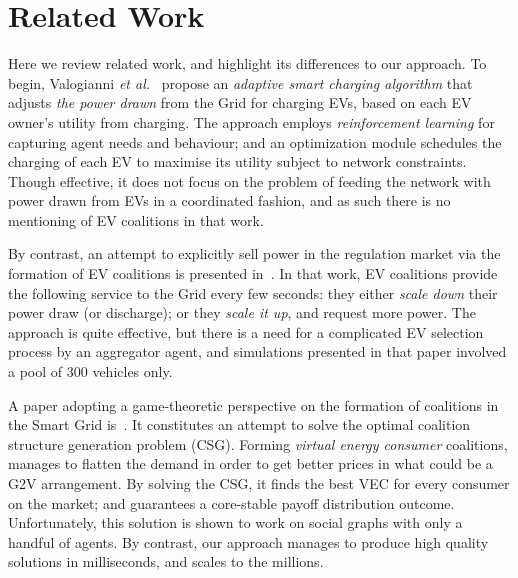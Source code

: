 
\chapter{Related Work} %

\label{Chapter2} %






Here we review related work, and highlight its differences to our approach.
To begin, Valogianni {\em et al.}~\cite{valogianni2014effective} propose an {\em adaptive smart charging algorithm} that adjusts {\em the power drawn} from the Grid for charging EVs, based on each EV owner's utility from charging. The approach employs {\em reinforcement learning} for capturing agent needs and behaviour; and an optimization module schedules the charging of each EV to maximise its utility subject to network constraints. Though effective, it does not focus on the problem of feeding the network with power drawn from EVs in a coordinated fashion, and as such there is no mentioning of EV coalitions in that work.

By contrast, an attempt to explicitly sell power in the regulation market via the formation of EV coalitions is presented in~\cite{kamboj2010exploring}. In that work, EV coalitions provide the following service to the Grid every few seconds: they either {\em scale down} their power draw (or discharge); or they {\em scale it up}, and request more power.
The approach is quite effective, but there is a need for a complicated EV selection process by an aggregator agent,
and simulations presented in that paper involved a pool of 300 vehicles only.

A paper adopting a game-theoretic perspective on the formation of coalitions in the Smart Grid is~\cite{vinyals2012stable}. It constitutes an attempt to solve the optimal coalition structure generation problem (CSG). Forming {\em virtual energy consumer} coalitions, manages to flatten the demand in order to get better prices in what could be a G2V arrangement. By solving the CSG, it finds the best VEC for every consumer on the market; and guarantees a core-stable payoff distribution outcome. Unfortunately, this solution is shown to work on social graphs with only a handful of agents. By contrast, our approach manages to produce high quality solutions in milliseconds, and scales to the millions.

